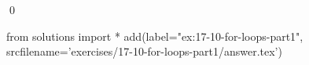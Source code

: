 
\begin{ex}
  \label{ex:17-10-for-loops-part1}
  
  \qed
\end{ex}
\begin{python0}
from solutions import *
add(label="ex:17-10-for-loops-part1",
    srcfilename='exercises/17-10-for-loops-part1/answer.tex')
\end{python0}
